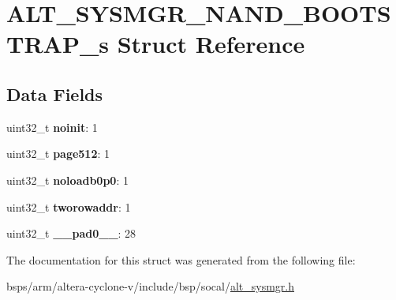 \hypertarget{structALT__SYSMGR__NAND__BOOTSTRAP__s}{}\section{A\+L\+T\+\_\+\+S\+Y\+S\+M\+G\+R\+\_\+\+N\+A\+N\+D\+\_\+\+B\+O\+O\+T\+S\+T\+R\+A\+P\+\_\+s Struct Reference}
\label{structALT__SYSMGR__NAND__BOOTSTRAP__s}
\subsection*{Data Fields}
\begin{DoxyCompactItemize}
\item 
\mbox{\label{structALT__SYSMGR__NAND__BOOTSTRAP__s_a7e654b779560c86a0535c0321012c762}} 
uint32\+\_\+t {\bfseries noinit}\+: 1
\item 
\mbox{\label{structALT__SYSMGR__NAND__BOOTSTRAP__s_adb8d951f63705e4b79b99f2f562ee0bf}} 
uint32\+\_\+t {\bfseries page512}\+: 1
\item 
\mbox{\label{structALT__SYSMGR__NAND__BOOTSTRAP__s_a564e6420761a5c7c5fa9a2def0d2baf1}} 
uint32\+\_\+t {\bfseries noloadb0p0}\+: 1
\item 
\mbox{\label{structALT__SYSMGR__NAND__BOOTSTRAP__s_a9dccf9d9fa6374fbdc710eebbb407915}} 
uint32\+\_\+t {\bfseries tworowaddr}\+: 1
\item 
\mbox{\label{structALT__SYSMGR__NAND__BOOTSTRAP__s_aae6d11fa8df1c109c25d9b5b75e6ee8f}} 
uint32\+\_\+t {\bfseries \+\_\+\+\_\+pad0\+\_\+\+\_\+}\+: 28
\end{DoxyCompactItemize}


The documentation for this struct was generated from the following file\+:\begin{DoxyCompactItemize}
\item 
bsps/arm/altera-\/cyclone-\/v/include/bsp/socal/\mbox{\hyperlink{alt__sysmgr_8h}{alt\+\_\+sysmgr.\+h}}\end{DoxyCompactItemize}
